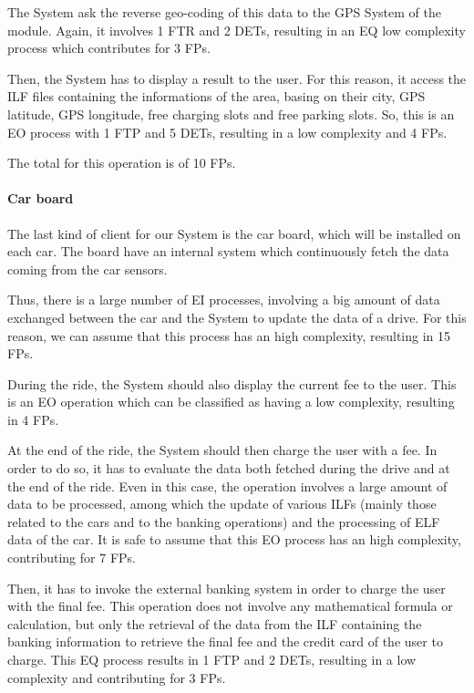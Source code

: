 The System ask the reverse geo-coding of this data to the GPS System of the module. Again, it involves 1 FTR and 2 DETs, resulting in an EQ low complexity process which contributes for 3 FPs.

Then, the System has to display a result to the user. For this reason, it access the ILF files containing the informations of the area, basing on their city, GPS latitude, GPS longitude, free charging slots and free parking slots. So, this is an EO process with 1 FTP and 5 DETs, resulting in a low complexity and 4 FPs.

The total for this operation is of 10 FPs.

\paragraph{Car board}
The last kind of client for our System is the car board, which will be installed on each car. The board have an internal system which continuously fetch the data coming from the car sensors. 

Thus, there is a large number of EI processes, involving a big amount of data exchanged between the car and the System to update the data of a drive. For this reason, we can assume that this process has an high complexity, resulting in 15 FPs.

During the ride, the System should also display the current fee to the user. This is an EO operation which can be classified as having a low complexity, resulting in 4 FPs.

At the end of the ride, the System should then charge the user with a fee. In order to do so, it has to evaluate the data both fetched during the drive and at the end of the ride. Even in this case, the operation involves a large amount of data to be processed, among which the update of various ILFs (mainly those related to the cars and to the banking operations) and the processing of ELF data of the car. It is safe to assume that this EO process has an high complexity, contributing for 7 FPs.

Then, it has to invoke the external banking system in order to charge the user with the final fee. This operation does not involve any mathematical formula or calculation, but only the retrieval of the data from the ILF containing the banking information to retrieve the final fee and the credit card of the user to charge. This EQ process results in 1 FTP and 2 DETs, resulting in a low complexity and contributing for 3 FPs.

